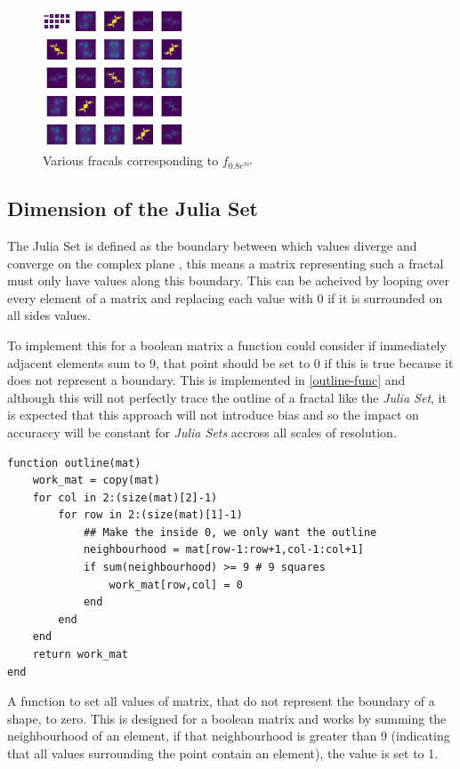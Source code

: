 \documentclass[a4paper,11pt,twoside]{article}
\begin{document}
\begin{figure}[htbp]
\centering
\includegraphics[width=0.38\textwidth]{media/Outline/many_julia_fractals_around_circle.png}
\caption{\label{montage-frac}Various fracals corresponding to \(f_{0.8 e^{\pi i \tau}}\)}
\end{figure}

\subsection{Dimension of the Julia Set}
\label{dim-julia}
The Julia Set is defined as the boundary between which values diverge and
converge on the complex plane
\cite[\S 14.1]{falconerFractalGeometryMathematical2003b}, this means a matrix
representing such a fractal must only have values along this boundary. This can
be acheived by looping over every element of a matrix and replacing each value
with 0 if it is surrounded on all sides values.

To implement this for a boolean matrix a function could consider if immediately
adjacent elements sum to 9, that point should be set to 0 if this is true
because it does not represent a boundary. This is implemented in \ref{outline-func}
and although this will not perfectly trace the outline of a fractal like the
\emph{Julia Set}, it is expected that this approach will not introduce bias and so
the impact on accuraccy will be constant for \emph{Julia Sets} accross all scales of
resolution.

\begin{listing}[htbp]
\begin{verbatim}
function outline(mat)
    work_mat = copy(mat)
    for col in 2:(size(mat)[2]-1)
        for row in 2:(size(mat)[1]-1)
            ## Make the inside 0, we only want the outline
            neighbourhood = mat[row-1:row+1,col-1:col+1]
            if sum(neighbourhood) >= 9 # 9 squares
                work_mat[row,col] = 0
            end
        end
    end
    return work_mat
end
\end{verbatim}
\caption{\label{outline-func}A function to set all values of matrix, that do not represent the boundary of a shape, to zero. This is designed for a boolean matrix and works by summing the neighbourhood of an element, if that neighbourhood is greater than 9 (indicating that all values surrounding the point contain an element), the value is set to 1.}
\end{listing}
\end{document}
